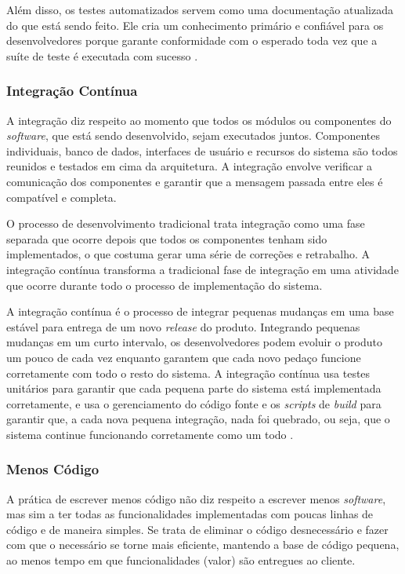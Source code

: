 Além disso, os testes automatizados servem como uma documentação atualizada do que está sendo feito. Ele cria um conhecimento primário e confiável para os desenvolvedores porque garante conformidade com o esperado toda vez que a suíte de teste é executada com sucesso \cite{hibbs2009}.

\subsubsection[Integração Contínua]{Integração Contínua}

A integração diz respeito ao momento que todos os módulos ou componentes do \textit{software}, que está sendo desenvolvido, sejam executados juntos. Componentes individuais, banco de dados, interfaces de usuário e recursos do sistema são todos reunidos e testados em cima da arquitetura. A integração envolve verificar a comunicação dos componentes e garantir que a mensagem passada entre eles é compatível e completa. 

O processo de desenvolvimento tradicional trata integração como uma fase separada que ocorre depois que todos os componentes tenham sido implementados, o que costuma gerar uma série de correções e retrabalho. A integração contínua transforma a tradicional fase de integração em uma atividade que ocorre durante todo o processo de implementação do sistema.

A integração contínua é o processo de integrar pequenas mudanças em uma base estável para entrega de um novo \textit{release} do produto. Integrando pequenas mudanças em um curto intervalo, os desenvolvedores podem evoluir o produto um pouco de cada vez enquanto garantem que cada novo pedaço funcione corretamente com todo o resto do sistema. A integração contínua usa testes unitários para garantir que cada pequena parte do sistema está implementada corretamente, e usa o gerenciamento do código fonte e os \textit{scripts} de \textit{build} para garantir que, a cada nova pequena integração, nada foi quebrado, ou seja, que o sistema continue funcionando corretamente como um todo \cite{hibbs2009}. 

\subsubsection[Menos Código ]{Menos Código}

A prática de escrever menos código não diz respeito a escrever menos \textit{software}, mas sim a ter todas as funcionalidades implementadas com poucas linhas de código e de maneira simples. Se trata de eliminar o código desnecessário e fazer com que o necessário se torne mais eficiente, mantendo a base de código pequena, ao menos tempo em que funcionalidades (valor) são entregues ao cliente.

